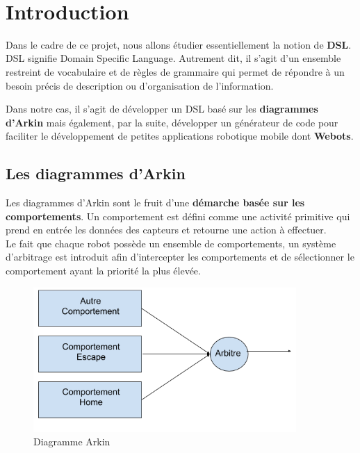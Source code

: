 \documentclass[a4paper,12pt]{article}
\begin{document}
\renewcommand{\headrulewidth}{1pt}
{\ \vspace{-1cm}}

\renewcommand{\contentsname}{Sommaire}
\tableofcontents
\newpage

\section{Introduction}
Dans le cadre de ce projet, nous allons étudier essentiellement la notion de \textbf{DSL}.
DSL signifie Domain Specific Language. Autrement dit, il s’agit d’un ensemble restreint de vocabulaire et de règles de grammaire qui permet de répondre à un besoin précis de description ou d’organisation de l’information.

Dans notre cas, il s'agit de développer un DSL basé sur les \textbf{diagrammes d’Arkin} mais également, par la suite, développer un générateur de code pour faciliter le
développement de petites applications robotique mobile dont \textbf{Webots}.

\subsection{Les diagrammes d'Arkin}
Les diagrammes d'Arkin sont le fruit d'une \textbf{démarche basée sur les comportements}. Un comportement est défini comme une activité primitive qui prend en entrée les données des capteurs et retourne une action à effectuer.
\\Le fait que chaque robot possède un ensemble de comportements, un système d’arbitrage est introduit afin d'intercepter les comportements et de sélectionner le comportement ayant la priorité la plus élevée.
\vspace{0.5cm}
\begin{figure}[!h]
    \center
    \includegraphics[width=10cm]{arkin.png}
    \caption{Diagramme Arkin}
\end{figure}
\vspace{1cm}
\end{document}
